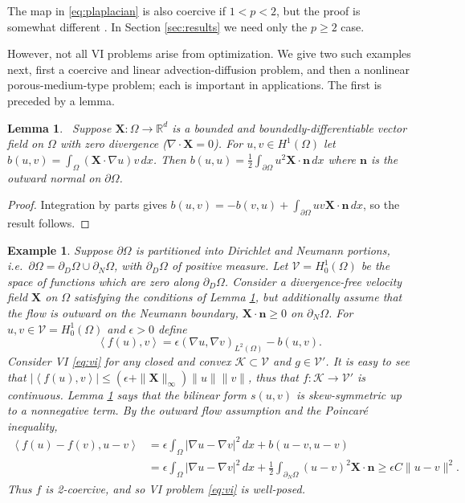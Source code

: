 \documentclass[letterpaper,final,12pt,reqno]{amsart}
\theoremstyle{cstyle}
\newtheorem{lemma}[theorem]{Lemma}
\theoremstyle{cstyle*}
\theoremstyle{dstyle}
\newtheorem{example}[theorem]{Example}
\numberwithin{equation}{section}
\numberwithin{figure}{section}
\numberwithin{table}{section}
\numberwithin{theorem}{section}
\newcommand{\eps}{\epsilon}
\newcommand{\RR}{\mathbb{R}}
\newcommand{\grad}{\nabla}
\newcommand{\Div}{\nabla\cdot}
\newcommand{\bn}{\mathbf{n}}
\newcommand{\bX}{\mathbf{X}}
\newcommand{\cK}{\mathcal{K}}
\newcommand{\cV}{\mathcal{V}}
\newcommand{\ip}[2]{\left<#1,#2\right>}
\begin{document}
The map in \eqref{eq:plaplacian} is also coercive if $1<p<2$, but the proof is somewhat different \cite[Theorem 4.4]{Bueler2021conservation}.  In Section \ref{sec:results} we need only the $p\ge 2$ case.

However, not all VI problems arise from optimization.  We give two such examples next, first a coercive and linear advection-diffusion problem, and then a nonlinear porous-medium-type problem; each is important in applications.  The first is preceded by a lemma.

\begin{lemma}  \label{lem:advectionskew}  \cite{Elmanetal2014}\,  Suppose $\bX :\Omega \to \RR^d$ is a bounded and boundedly-differentiable vector field on $\Omega$ with zero divergence ($\Div \bX=0$).  For $u,v \in H^1(\Omega)$ let $b(u,v) = \int_\Omega (\bX \cdot \grad u) v\,dx$.  Then $b(u,u) = \frac{1}{2} \int_{\partial \Omega} u^2 \bX\cdot \bn\,dx$ where $\bn$ is the outward normal on $\partial \Omega$.
\end{lemma}

\begin{proof}
Integration by parts gives $b(u,v) = - b(v,u) + \int_{\partial \Omega} uv \bX\cdot \bn\,dx$, so the result follows.
\end{proof}

\begin{example}  \label{ex:advectiondiffusion}  Suppose $\partial\Omega$ is partitioned into Dirichlet and Neumann portions, i.e.~$\partial\Omega = \partial_D\Omega \cup \partial_N\Omega$, with $\partial_D\Omega$ of positive measure.  Let $\cV = H_0^1(\Omega)$ be the space of functions which are zero along $\partial_D\Omega$.  Consider a divergence-free velocity field $\bX$ on $\Omega$ satisfying the conditions of Lemma \ref{lem:advectionskew}, but additionally assume that the flow is outward on the Neumann boundary, $\bX \cdot \bn \ge 0$ on $\partial_N\Omega$.  For $u,v \in \cV = H_0^1(\Omega)$ and $\eps>0$ define
\begin{equation}
\ip{f(u)}{v} = \eps \left(\grad u, \grad v\right)_{L^2(\Omega)} - b(u,v). \label{eq:advectiondiffusion}
\end{equation}
Consider VI \eqref{eq:vi} for any closed and convex $\cK \subset \cV$ and $g\in\cV'$.  It is easy to see that $|\ip{f(u)}{v}| \le (\eps + \|\bX\|_\infty) \|u\| \|v\|$, thus that $f:\cK \to \cV'$ is continuous.  Lemma \ref{lem:advectionskew} says that the bilinear form $s(u,v)$ is skew-symmetric up to a nonnegative term.  By the outward flow assumption and the Poincar\'e inequality,
\begin{align*}
\ip{f(u)-f(v)}{u-v} &= \eps \int_\Omega |\grad u - \grad v|^2\,dx + b(u-v,u-v) \\
                    &= \eps \int_\Omega |\grad u - \grad v|^2\,dx + \frac{1}{2} \int_{\partial_N\Omega} (u-v)^2 \bX\cdot\bn \ge \eps C \|u-v\|^2.
\end{align*}
Thus $f$ is 2-coercive, and so VI problem \eqref{eq:vi} is well-posed.
\end{example}
\end{document}
